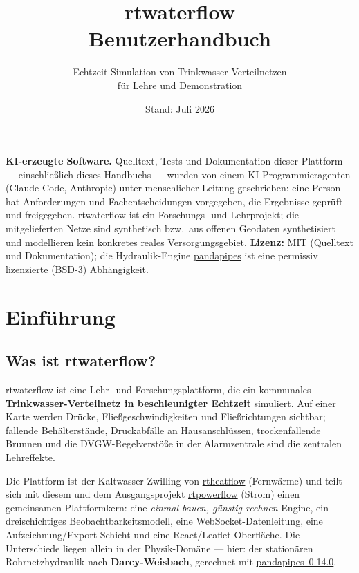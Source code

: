 \documentclass[11pt,a4paper,parskip=half]{scrreprt}
\title{rtwaterflow\\[0.3em]\Large Benutzerhandbuch}
\subtitle{Echtzeit-Simulation von Trinkwasser-Verteilnetzen\\für Lehre und
          Demonstration}
\author{}
\date{Stand: Juli 2026}
\begin{document}
\maketitle

\begin{tcolorbox}[colback=gray!5,colframe=gray!50,arc=1pt,boxrule=0.5pt]
\small
\textbf{KI-erzeugte Software.} Quelltext, Tests und Dokumentation dieser
Plattform — einschließlich dieses Handbuchs — wurden von einem KI-Programmier\-agenten
(Claude Code, Anthropic) unter menschlicher Leitung geschrieben: eine Person hat
Anforderungen und Fachentscheidungen vorgegeben, die Ergebnisse geprüft und
freigegeben. rtwaterflow ist ein Forschungs- und Lehrprojekt; die mitgelieferten
Netze sind synthetisch bzw.\ aus offenen Geodaten synthetisiert und modellieren
kein konkretes reales Versorgungsgebiet. \textbf{Lizenz:} MIT (Quelltext und
Dokumentation); die Hydraulik-Engine \href{https://github.com/e2nIEE/pandapipes}{pandapipes}
ist eine permissiv lizenzierte (BSD-3) Abhängigkeit.
\end{tcolorbox}

\tableofcontents

\chapter{Einführung}
\label{ch:einfuehrung}

\section{Was ist rtwaterflow?}

rtwaterflow ist eine Lehr- und Forschungsplattform, die ein kommunales
\textbf{Trinkwasser-Verteilnetz in beschleunigter Echtzeit} simuliert. Auf einer
Karte werden Drücke, Fließgeschwindigkeiten und Fließrichtungen sichtbar;
fallende Behälterstände, Druckabfälle an Hausanschlüssen, trockenfallende Brunnen
und die DVGW-Regelverstöße in der Alarmzentrale sind die zentralen Lehreffekte.

Die Plattform ist der Kaltwasser-Zwilling von
\href{https://github.com/markisbell/rtheatflow}{rtheatflow} (Fernwärme) und
teilt sich mit diesem und dem Ausgangsprojekt
\href{https://github.com/markisbell/rtpowerflow}{rtpowerflow} (Strom) einen
gemeinsamen Plattformkern: eine \emph{einmal bauen, günstig rechnen}-Engine, ein
dreischichtiges Beobachtbarkeitsmodell, eine WebSocket-Datenleitung, eine
Aufzeichnung/Export-Schicht und eine React/Leaflet-Oberfläche. Die Unterschiede
liegen allein in der Physik-Domäne — hier: der stationären Rohrnetzhydraulik nach
\textbf{Darcy-Weisbach}, gerechnet mit
\href{https://github.com/e2nIEE/pandapipes}{pandapipes~0.14.0}.
\end{document}
